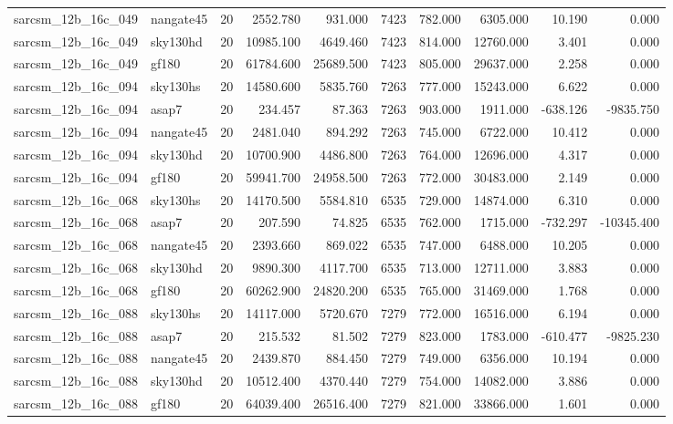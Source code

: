 \begin{tabular}{llrrrrrrrr}
sarcsm\_12b\_16c\_049 & nangate45 & 20 & 2552.780 & 931.000 & 7423 & 782.000 & 6305.000 & 10.190 & 0.000 \\
sarcsm\_12b\_16c\_049 & sky130hd & 20 & 10985.100 & 4649.460 & 7423 & 814.000 & 12760.000 & 3.401 & 0.000 \\
sarcsm\_12b\_16c\_049 & gf180 & 20 & 61784.600 & 25689.500 & 7423 & 805.000 & 29637.000 & 2.258 & 0.000 \\
sarcsm\_12b\_16c\_094 & sky130hs & 20 & 14580.600 & 5835.760 & 7263 & 777.000 & 15243.000 & 6.622 & 0.000 \\
sarcsm\_12b\_16c\_094 & asap7 & 20 & 234.457 & 87.363 & 7263 & 903.000 & 1911.000 & -638.126 & -9835.750 \\
sarcsm\_12b\_16c\_094 & nangate45 & 20 & 2481.040 & 894.292 & 7263 & 745.000 & 6722.000 & 10.412 & 0.000 \\
sarcsm\_12b\_16c\_094 & sky130hd & 20 & 10700.900 & 4486.800 & 7263 & 764.000 & 12696.000 & 4.317 & 0.000 \\
sarcsm\_12b\_16c\_094 & gf180 & 20 & 59941.700 & 24958.500 & 7263 & 772.000 & 30483.000 & 2.149 & 0.000 \\
sarcsm\_12b\_16c\_068 & sky130hs & 20 & 14170.500 & 5584.810 & 6535 & 729.000 & 14874.000 & 6.310 & 0.000 \\
sarcsm\_12b\_16c\_068 & asap7 & 20 & 207.590 & 74.825 & 6535 & 762.000 & 1715.000 & -732.297 & -10345.400 \\
sarcsm\_12b\_16c\_068 & nangate45 & 20 & 2393.660 & 869.022 & 6535 & 747.000 & 6488.000 & 10.205 & 0.000 \\
sarcsm\_12b\_16c\_068 & sky130hd & 20 & 9890.300 & 4117.700 & 6535 & 713.000 & 12711.000 & 3.883 & 0.000 \\
sarcsm\_12b\_16c\_068 & gf180 & 20 & 60262.900 & 24820.200 & 6535 & 765.000 & 31469.000 & 1.768 & 0.000 \\
sarcsm\_12b\_16c\_088 & sky130hs & 20 & 14117.000 & 5720.670 & 7279 & 772.000 & 16516.000 & 6.194 & 0.000 \\
sarcsm\_12b\_16c\_088 & asap7 & 20 & 215.532 & 81.502 & 7279 & 823.000 & 1783.000 & -610.477 & -9825.230 \\
sarcsm\_12b\_16c\_088 & nangate45 & 20 & 2439.870 & 884.450 & 7279 & 749.000 & 6356.000 & 10.194 & 0.000 \\
sarcsm\_12b\_16c\_088 & sky130hd & 20 & 10512.400 & 4370.440 & 7279 & 754.000 & 14082.000 & 3.886 & 0.000 \\
sarcsm\_12b\_16c\_088 & gf180 & 20 & 64039.400 & 26516.400 & 7279 & 821.000 & 33866.000 & 1.601 & 0.000 \\

\end{tabular}
